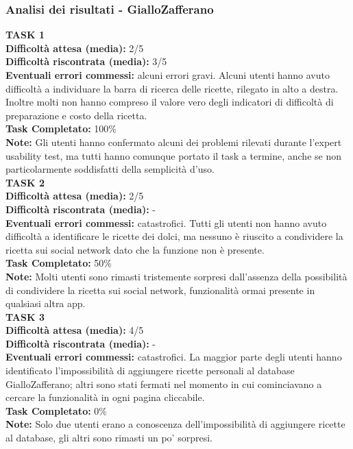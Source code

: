 \subsubsection*{Analisi dei risultati - GialloZafferano}
\textbf{TASK 1}\\
\textbf{Difficoltà attesa (media):} 2/5\\
\textbf{Difficoltà riscontrata (media):} 3/5\\
\textbf{Eventuali errori commessi:} alcuni errori gravi. Alcuni utenti hanno avuto difficoltà a individuare la barra di ricerca delle ricette, rilegato in alto a destra. Inoltre molti non hanno compreso il valore vero degli indicatori di difficoltà di preparazione e costo della ricetta.\\
\textbf{Task Completato:} 100\%\\
\textbf{Note:} Gli utenti hanno confermato alcuni dei problemi rilevati durante l'expert usability test, ma tutti hanno comunque portato il task a termine, anche se non particolarmente soddisfatti della semplicità d'uso.\\

\textbf{TASK 2}\\
\textbf{Difficoltà attesa (media):} 2/5\\
\textbf{Difficoltà riscontrata (media):} -\\
\textbf{Eventuali errori commessi:} catastrofici. Tutti gli utenti non hanno avuto difficoltà a identificare le ricette dei dolci, ma nessuno è riuscito a condividere la ricetta sui social network dato che la funzione non è presente.\\
\textbf{Task Completato:} 50\%\\
\textbf{Note:} Molti utenti sono rimasti tristemente sorpresi dall'assenza della possibilità di condividere la ricetta sui social network, funzionalità ormai presente in qualsiasi altra app.\\

\textbf{TASK 3}\\
\textbf{Difficoltà attesa (media):} 4/5\\
\textbf{Difficoltà riscontrata (media):} -\\
\textbf{Eventuali errori commessi:} catastrofici. La maggior parte degli utenti hanno identificato l'impossibilità di aggiungere ricette personali al database GialloZafferano; altri sono stati fermati nel momento in cui cominciavano a cercare la funzionalità in ogni pagina cliccabile. \\
\textbf{Task Completato:} 0\%\\
\textbf{Note:} Solo due utenti erano a conoscenza dell'impossibilità di aggiungere ricette al database, gli altri sono rimasti un po' sorpresi.\\

